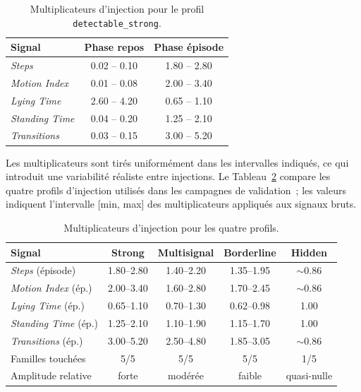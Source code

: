 \begin{table}[H]
    \centering
    \caption{Multiplicateurs d'injection pour le profil \texttt{detectable\_strong}.}
    \label{tab:injection_multiplicateurs}
    \begin{tabular}{lcc}
        \toprule
        \textbf{Signal}       & \textbf{Phase repos}   & \textbf{Phase épisode} \\
        \midrule
        \textit{Steps}                 & 0.02 -- 0.10           & 1.80 -- 2.80 \\
        \textit{Motion Index}          & 0.01 -- 0.08           & 2.00 -- 3.40 \\
        \textit{Lying Time}            & 2.60 -- 4.20           & 0.65 -- 1.10 \\
        \textit{Standing Time}         & 0.04 -- 0.20           & 1.25 -- 2.10 \\
        \textit{Transitions}           & 0.03 -- 0.15           & 3.00 -- 5.20 \\
        \bottomrule
    \end{tabular}
\end{table}

Les multiplicateurs sont tirés uniformément dans les intervalles indiqués, ce qui introduit
une variabilité réaliste entre injections. Le Tableau~\ref{tab:injection_tous_profils}
compare les quatre profils d'injection utilisés dans les campagnes de validation~; les
valeurs indiquent l'intervalle [min, max] des multiplicateurs appliqués aux signaux
bruts.

\begin{table}[H]
    \centering
    \caption{Multiplicateurs d'injection pour les quatre profils.}
    \label{tab:injection_tous_profils}
    \small
    \begin{tabular}{lcccc}
        \toprule
        \textbf{Signal} & \textbf{Strong} & \textbf{Multisignal} & \textbf{Borderline}
            & \textbf{Hidden} \\
        \midrule
        \textit{Steps} (épisode)     & 1.80--2.80 & 1.40--2.20 & 1.35--1.95 & $\sim$0.86 \\
        \textit{Motion Index} (ép.)  & 2.00--3.40 & 1.60--2.80 & 1.70--2.45 & $\sim$0.86 \\
        \textit{Lying Time} (ép.)    & 0.65--1.10 & 0.70--1.30 & 0.62--0.98 & 1.00 \\
        \textit{Standing Time} (ép.) & 1.25--2.10 & 1.10--1.90 & 1.15--1.70 & 1.00 \\
        \textit{Transitions} (ép.)   & 3.00--5.20 & 2.50--4.80 & 1.85--3.05 & $\sim$0.86 \\
        \midrule
        Familles touchées   & 5/5        & 5/5        & 5/5        & 1/5 \\
        Amplitude relative  & forte      & modérée    & faible     & quasi-nulle \\
        \bottomrule
    \end{tabular}
\end{table}

